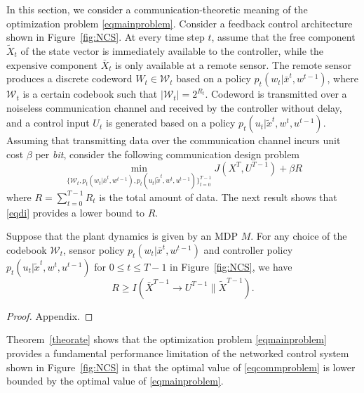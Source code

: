 
In this section, we consider a communication-theoretic meaning of the optimization problem \eqref{eqmainproblem}. Consider a feedback control architecture shown in Figure~\ref{fig:NCS}. 
At every time step $t$, assume that the free component $\tilde{X}_t$ of the state vector is immediately available to the controller, while the expensive component $\bar{X}_t$ is only available at a remote sensor. The remote sensor produces a discrete codeword $W_t\in\mathcal{W}_t$ based on a policy $p_t(w_t|\bar{x}^t, w^{t-1})$, where $\mathcal{W}_t$ is a certain codebook such that $|\mathcal{W}_t|=2^{R_t}$. Codeword is transmitted over a noiseless communication channel and received by the controller without delay, and a control input $U_t$ is generated based on a policy $p_t(u_t|\tilde{x}^t, w^t, u^{t-1})$.
Assuming that transmitting data over the communication channel incurs unit cost $\beta$ per \emph{bit}, consider the following communication design problem
\begin{equation}
\min_{\{\mathcal{W}_t, p_t(w_t|\bar{x}^t, w^{t-1}), p_t(u_t|\tilde{x}^t, w^t, u^{t-1}) \}_{t=0}^{T-1}}  J(X^T, U^{T-1}) +\beta R \label{eqcommproblem}
\end{equation}
where $R=\sum_{t=0}^{T-1}R_t$ is the total amount of data. 
The next result shows that \eqref{eqdi} provides a lower bound to $R$.
\begin{theorem}
\label{theorate}
Suppose that the plant dynamics is given by an MDP $M$. For any choice of the codebook $\mathcal{W}_t$, sensor policy $p_t(w_t|\bar{x}^t, w^{t-1})$ and controller policy $p_t(u_t|\tilde{x}^t, w^t, u^{t-1})$ for $0\leq t\leq T-1$ in Figure~\ref{fig:NCS}, we have
\[
R \geq I(\bar{X}^{T-1}\rightarrow U^{T-1}\| \tilde{X}^{T-1}).
\]
\end{theorem}
\begin{proof}
Appendix.
\end{proof}
Theorem~\ref{theorate} shows that the optimization problem \eqref{eqmainproblem} provides a fundamental performance limitation of the networked control system shown in Figure~\ref{fig:NCS} in that the optimal value of \eqref{eqcommproblem} is lower bounded by the optimal value of \eqref{eqmainproblem}.




